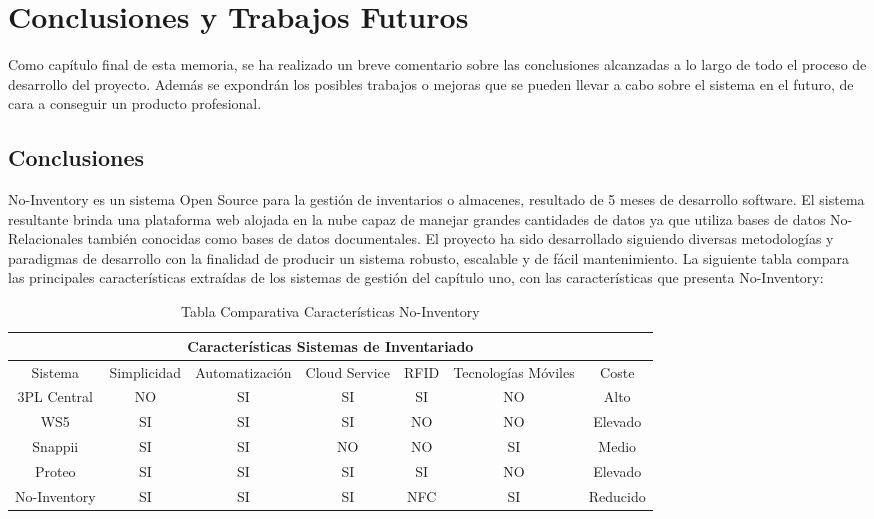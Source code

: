 \documentclass[a4paper,11pt]{book}
\begin{document}
\chapter{Conclusiones y Trabajos Futuros}

Como capítulo final de esta memoria, se ha realizado un breve comentario sobre las conclusiones alcanzadas a lo largo de todo el proceso de desarrollo del proyecto. Además se expondrán los posibles trabajos o mejoras que se pueden llevar a cabo sobre el sistema en el futuro, de cara a conseguir un producto profesional. 

\section{Conclusiones}

No-Inventory es un sistema Open Source para la gestión de inventarios o almacenes, resultado de 5 meses de desarrollo software. El sistema resultante brinda una plataforma web alojada en la nube capaz de manejar grandes cantidades de datos ya que utiliza bases de datos No-Relacionales también conocidas como bases de datos documentales. El proyecto ha sido desarrollado siguiendo diversas metodologías y paradigmas de desarrollo con la finalidad de producir un sistema robusto, escalable y de fácil mantenimiento. La siguiente tabla compara las principales características extraídas de los sistemas de gestión del capítulo uno, con las características que presenta No-Inventory: 

\begin{table}[H]
\centering
\begin{tabular}{|c|c|c|c|c|c|c|}\hline
\multicolumn{7}{|c|}{Características Sistemas de Inventariado } \\ \hline
Sistema & Simplicidad & Automatización  & Cloud Service & RFID & Tecnologías Móviles & Coste\\\hline 
3PL Central & NO & SI & SI & SI & NO & Alto \\ \hline
WS5 & SI & SI & SI & NO & NO & Elevado \\ \hline
Snappii & SI & SI & NO & NO & SI & Medio \\ \hline
Proteo & SI & SI & SI & SI & NO & Elevado \\ \hline
No-Inventory & SI & SI & SI & NFC & SI & Reducido \\ \hline
\end{tabular}
\caption{Tabla Comparativa Características No-Inventory}
\end{table}
\end{document}

